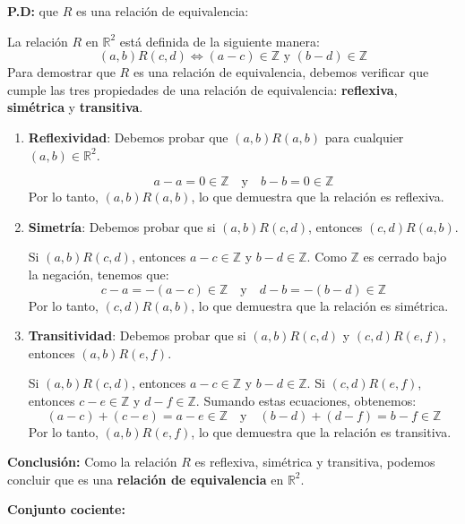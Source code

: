 \begin{solution}
\textbf{P.D:} que \( R \) es una relación de equivalencia:

La relación \( R \) en \( \mathbb{R}^2 \) está definida de la siguiente manera:
\[
(a, b) R (c, d) \iff (a - c) \in \mathbb{Z} \text{ y } (b - d) \in \mathbb{Z}
\]
Para demostrar que \( R \) es una relación de equivalencia, debemos verificar que cumple las tres propiedades de una relación de equivalencia: \textbf{reflexiva}, \textbf{simétrica} y \textbf{transitiva}.

\begin{enumerate}[label=\arabic*.]
    \item \textbf{Reflexividad}:
    Debemos probar que \( (a, b) R (a, b) \) para cualquier \( (a, b) \in \mathbb{R}^2 \).
    
    \[
    a - a = 0 \in \mathbb{Z} \quad \text{y} \quad b - b = 0 \in \mathbb{Z}
    \]
    Por lo tanto, \( (a, b) R (a, b) \), lo que demuestra que la relación es reflexiva.
    \item \textbf{Simetría}:
    Debemos probar que si \( (a, b) R (c, d) \), entonces \( (c, d) R (a, b) \).
    
    Si \( (a, b) R (c, d) \), entonces \( a - c \in \mathbb{Z} \) y \( b - d \in \mathbb{Z} \). Como \( \mathbb{Z} \) es cerrado bajo la negación, tenemos que:
    \[
    c - a = -(a - c) \in \mathbb{Z} \quad \text{y} \quad d - b = -(b - d) \in \mathbb{Z}
    \]
    Por lo tanto, \( (c, d) R (a, b) \), lo que demuestra que la relación es simétrica.
    
    \item \textbf{Transitividad}:
    Debemos probar que si \( (a, b) R (c, d) \) y \( (c, d) R (e, f) \), entonces \( (a, b) R (e, f) \).
    
    Si \( (a, b) R (c, d) \), entonces \( a - c \in \mathbb{Z} \) y \( b - d \in \mathbb{Z} \). Si \( (c, d) R (e, f) \), entonces \( c - e \in \mathbb{Z} \) y \( d - f \in \mathbb{Z} \). Sumando estas ecuaciones, obtenemos:
    \[
    (a - c) + (c - e) = a - e \in \mathbb{Z} \quad \text{y} \quad (b - d) + (d - f) = b - f \in \mathbb{Z}
    \]
    Por lo tanto, \( (a, b) R (e, f) \), lo que demuestra que la relación es transitiva.
\end{enumerate}

\textbf{Conclusión:}
Como la relación \( R \) es reflexiva, simétrica y transitiva, podemos concluir que es una \textbf{relación de equivalencia} en \( \mathbb{R}^2 \).

\textbf{Conjunto cociente:}


\end{solution}
